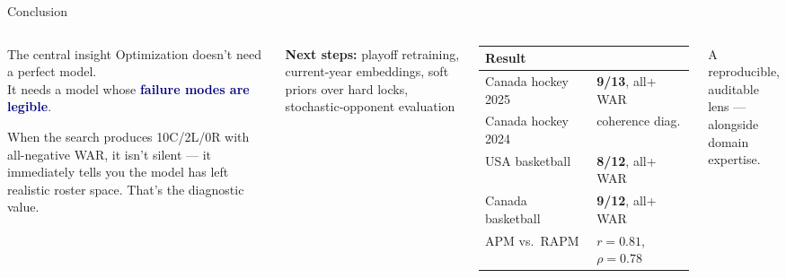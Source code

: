 \documentclass[aspectratio=169,11pt]{beamer}
\newcommand{\good}[1]{\textcolor{bgrn}{\textbf{#1}}}
\newcommand{\hl}[1]{\textcolor{navy}{\textbf{#1}}}
\begin{document}
\begin{frame}[shrink=5]{Conclusion}
\begin{columns}[T]
\begin{block}{The central insight}
  Optimization doesn't need a perfect model.\\
  It needs a model whose \hl{failure modes are legible}.

  \vspace{0.4em}
  When the search produces 10C/2L/0R with all-negative WAR, it isn't silent — it immediately tells you the model has left realistic roster space. That's the diagnostic value.
\end{block}
\vspace{0.4em}
{\small\textbf{Next steps:} playoff retraining,
current-year embeddings, soft priors over hard locks,
stochastic-opponent evaluation}

\small\begin{tabular}{@{}ll@{}}
\toprule
Result & \\
\midrule
Canada hockey 2025  & \good{9/13}, all+ WAR \\
Canada hockey 2024  & coherence diag. \\
USA basketball      & \good{8/12}, all+ WAR \\
Canada basketball   & \good{9/12}, all+ WAR \\
APM vs.\ RAPM       & $r{=}0.81$, $\rho{=}0.78$ \\
\bottomrule
\end{tabular}
\vspace{0.5em}

{\small\textcolor{steel}{A reproducible, auditable lens —\\
alongside domain expertise.}}
\end{columns}
\end{frame}
\end{document}
